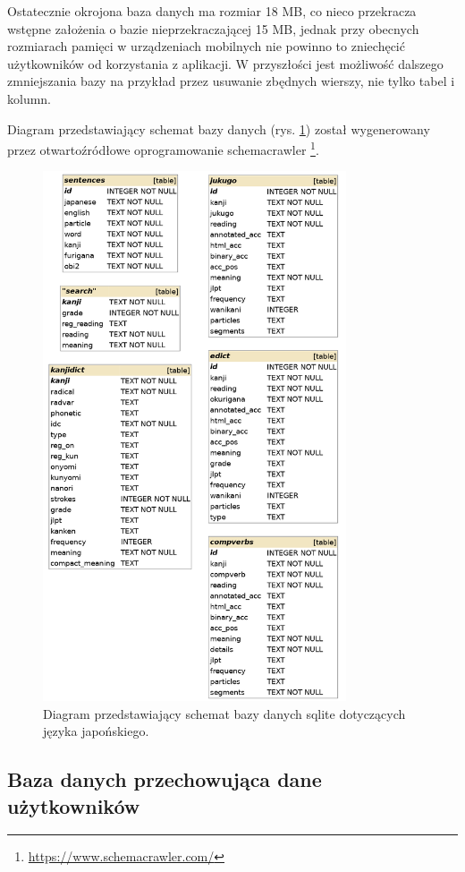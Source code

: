 \documentclass[a4paper,twoside,12pt]{book}
\begin{document}
Ostatecznie okrojona baza danych ma rozmiar 18 MB, co nieco przekracza wstępne założenia o bazie nieprzekraczającej 15 MB, jednak przy obecnych rozmiarach pamięci w urządzeniach mobilnych nie powinno to zniechęcić użytkowników od korzystania z aplikacji. W przyszłości jest możliwość dalszego zmniejszania bazy na przykład przez usuwanie zbędnych wierszy, nie tylko tabel i kolumn.

Diagram przedstawiający schemat bazy danych (rys. \ref{fig:kanjidb}) został wygenerowany przez otwartoźródłowe oprogramowanie schemacrawler \footnote{\url{https://www.schemacrawler.com/}}.
\begin{figure}[]
\centering
\includegraphics[width=0.8\textwidth]{kanjidb}
\caption{Diagram przedstawiający schemat bazy danych sqlite dotyczących języka japońskiego.}
\label{fig:kanjidb}
\end{figure}

\subsection{Baza danych przechowująca dane użytkowników}
\end{document}
